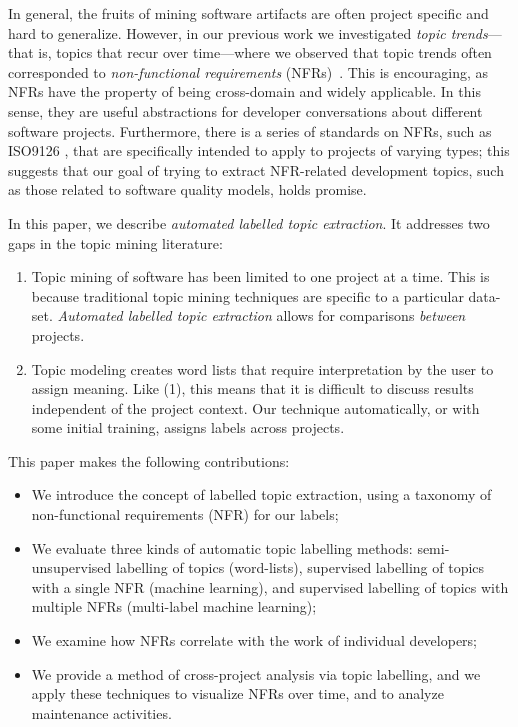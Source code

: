 \documentclass[smallextended]{svjour3}       %
\begin{document}
In general, the fruits of mining software artifacts are often project
specific and hard to generalize.  
However, in our previous work we
investigated \emph{topic trends}---that is, topics that recur over
time---where we observed that topic trends often corresponded to
\emph{non-functional requirements} (NFRs)~\cite{Hindle09ICSM}.
This is encouraging, as NFRs have the property of being cross-domain
and widely applicable. 
In this sense, they are useful abstractions for developer
conversations about different software projects.  
Furthermore, there is a series of standards on NFRs, such as ISO9126 \cite{iso9126}, that are specifically intended to apply to projects of varying
types; this suggests that our goal of trying to extract NFR-related development topics, such as those related to software quality models, holds promise.

In this paper, we describe \emph{automated labelled topic extraction}. It addresses two gaps in the topic mining literature:
\begin{enumerate}
  \item Topic mining of software has been limited to one project at a time. 
This is because traditional topic mining techniques are specific to a particular data-set. 
\textit{Automated labelled topic extraction} allows for comparisons \textit{between} projects. 
  \item Topic modeling creates word lists that require interpretation by the user to assign meaning. 
Like (1), this means
that it is difficult to discuss results independent of the project context. 
Our technique automatically, or with some initial training, assigns labels across projects.
\end{enumerate}

This paper makes the following contributions: 
\begin{itemize}
\item We introduce the concept of labelled topic extraction, using a taxonomy of non-functional requirements (NFR) for our labels; 
\item We evaluate three kinds of automatic topic labelling methods:
  semi-unsupervised labelling  of topics (word-lists), supervised labelling of
  topics with a single NFR (machine learning), 
  and supervised labelling of topics with multiple NFRs (multi-label
  machine learning);
\item We examine how NFRs correlate with the work of individual developers;
\item We provide a method of cross-project analysis via topic labelling, and
we apply these techniques to visualize NFRs over time, and to analyze maintenance activities.

\end{itemize}
\end{document}
